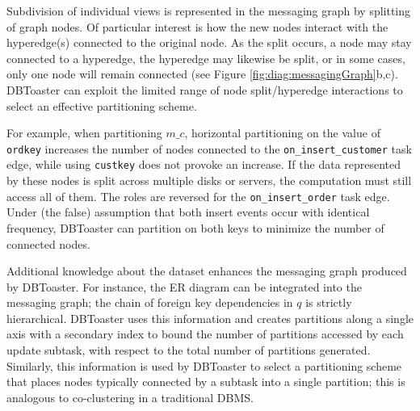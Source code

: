 {Subdivision of individual views is represented in the messaging graph by
splitting of graph nodes.  Of particular interest is how the new nodes interact
with the hyperedge(s) connected to the original node.  As the split occurs, a
node may stay connected to a hyperedge, the hyperedge may likewise be split, or
in some cases, only one node will remain connected (see Figure
\ref{fig:diag:messagingGraph}b,c).  DBToaster can exploit the limited range of
node split/hyperedge interactions to select an effective partitioning scheme.

For example, when partitioning $m\_c$, horizontal partitioning on the value of
\texttt{ordkey} increases the number of nodes connected to the
\texttt{on\_insert\_customer} task edge, while using \texttt{custkey} does not
provoke an increase.  If the data represented by these nodes is split across
multiple disks or servers, the computation must still access all of them.  The
roles are reversed for the \texttt{on\_insert\_order} task edge.  Under (the
false) assumption that both insert events occur with identical frequency,
DBToaster can partition on both keys to minimize the number of connected nodes.

Additional knowledge about the dataset enhances the messaging graph produced by
DBToaster.  For instance, the ER diagram can be integrated into the messaging
graph; the chain of foreign key dependencies in $q$ is strictly hierarchical. 
DBToaster uses this information and creates partitions along a single axis with
a secondary index to bound the number of partitions accessed by each update
subtask, with respect to the total number of partitions generated.  Similarly,
this information is used by DBToaster to select a partitioning scheme that
places nodes typically connected by a subtask into a single partition; this is
analogous to co-clustering in a traditional DBMS.

} %
